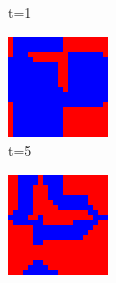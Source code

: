 \documentclass[a4paper, 11pt]{article}
\begin{document}
\begin{figure}[H]
\begin{subfigure}{.33\textwidth}
  \caption{t=1}
\end{subfigure}%
\begin{subfigure}{.33\textwidth}
  \centering
  \includegraphics[width=0.9\linewidth]{PRISONERS_DILEMMA_MOORE_20x20_t05}
  \caption{t=5}
\end{subfigure}
\begin{subfigure}{.33\textwidth}
  \centering
  \includegraphics[width=0.9\linewidth]{PRISONERS_DILEMMA_MOORE_20x20_t10}

\end{subfigure}
\end{figure}
\end{document}
